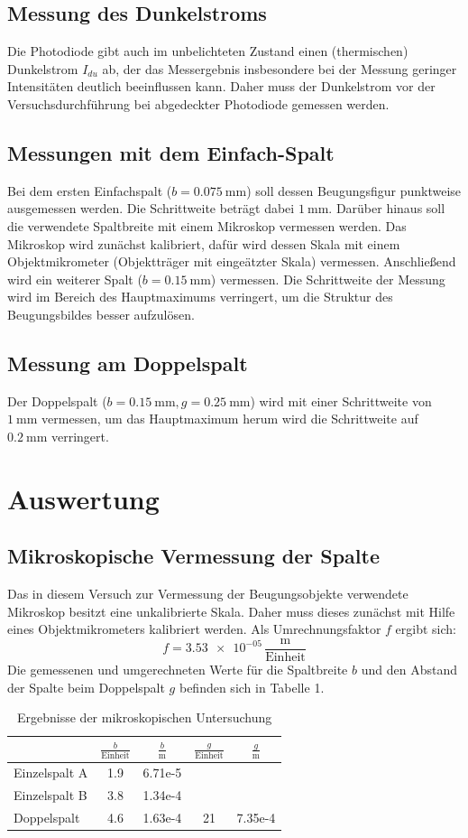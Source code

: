 \documentclass[11pt,ngerman,a4paper]{article}
\begin{document}
\subsection{Messung des Dunkelstroms}
Die Photodiode gibt auch im unbelichteten Zustand einen (thermischen) Dunkelstrom $I_{du}$ ab, der das Messergebnis insbesondere bei der Messung geringer Intensitäten deutlich beeinflussen kann. Daher muss der Dunkelstrom vor der Versuchsdurchführung bei abgedeckter Photodiode gemessen werden.
\subsection{Messungen mit dem Einfach-Spalt}
Bei dem ersten Einfachspalt ($b=\SI{0.075}{\milli \meter}$) soll dessen Beugungsfigur punktweise ausgemessen werden. Die Schrittweite beträgt dabei $\SI{1}{\milli \meter}$. Darüber hinaus soll die verwendete Spaltbreite mit einem Mikroskop vermessen werden. Das Mikroskop wird zunächst kalibriert, dafür wird dessen Skala mit einem Objektmikrometer (Objektträger mit eingeätzter Skala) vermessen.
\newline
Anschließend wird ein weiterer Spalt ($b=\SI{0.15}{\milli \meter}$) vermessen. Die Schrittweite der Messung wird im Bereich des Hauptmaximums verringert, um die Struktur des Beugungsbildes besser aufzulösen.  
\subsection{Messung am Doppelspalt}
Der Doppelspalt ($b=\SI{0.15}{\milli \meter}, g=\SI{0.25}{\milli \meter}$) wird mit einer Schrittweite von $\SI{1}{\milli \meter}$ vermessen, um das Hauptmaximum herum wird die Schrittweite auf $\SI{0.2}{\milli \meter}$ verringert.
\section{Auswertung}
\subsection{Mikroskopische Vermessung der Spalte}
Das in diesem Versuch zur Vermessung der Beugungsobjekte verwendete Mikroskop besitzt eine unkalibrierte Skala. Daher muss dieses zunächst mit Hilfe eines Objektmikrometers kalibriert werden. Als Umrechnungsfaktor $f$ ergibt sich:
\[
f = \num{3.53e-05}\,\frac{\si{\meter}}{\mathrm{Einheit}}
\]
Die gemessenen und umgerechneten Werte für die Spaltbreite $b$ und den Abstand der Spalte beim Doppelspalt $g$ befinden sich in Tabelle 1.
\begin{table}[H]
\centering
\begin{tabular}{lSSSS}

\toprule
&$\frac{b}{\mathrm{Einheit}}$ & $\frac{b}{\si{\meter}}$ & $\frac{g}{\mathrm{Einheit}}$ &$\frac{g}{\si{\meter}}$\\
\midrule
Einzelspalt A & 1.9 &6.71e-5 & &\\
Einzelspalt B & 3.8 &1.34e-4 &&\\
Doppelspalt & 4.6 & 1.63e-4&21&7.35e-4\\
\bottomrule
\end{tabular}
\caption{Ergebnisse der mikroskopischen Untersuchung}
\end{table}
\end{document}
